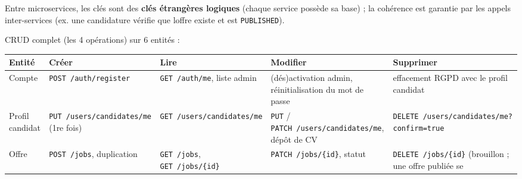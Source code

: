 \documentclass[
  11pt,
]{article}
\begin{document}
Entre microservices, les clés sont des \textbf{clés étrangères logiques}
(chaque service possède sa base) ; la cohérence est garantie par les
appels inter-services (ex. une candidature vérifie que
l\textquotesingle offre existe et est \texttt{PUBLISHED}).

CRUD complet (les 4 opérations) sur 6 entités :

\begin{longtable}[]{@{}
  >{\raggedright\arraybackslash}p{}
  >{\raggedright\arraybackslash}p{}
  >{\raggedright\arraybackslash}p{}
  >{\raggedright\arraybackslash}p{}
  >{\raggedright\arraybackslash}p{}@{}}
\toprule\noalign{}
\begin{minipage}[b]{\linewidth}\raggedright
Entité
\end{minipage} & \begin{minipage}[b]{\linewidth}\raggedright
Créer
\end{minipage} & \begin{minipage}[b]{\linewidth}\raggedright
Lire
\end{minipage} & \begin{minipage}[b]{\linewidth}\raggedright
Modifier
\end{minipage} & \begin{minipage}[b]{\linewidth}\raggedright
Supprimer
\end{minipage} \\
\midrule\noalign{}
\endhead
\bottomrule\noalign{}
\endlastfoot
Compte & \texttt{POST\ /auth/register} & \texttt{GET\ /auth/me}, liste
admin & (dés)activation admin, réinitialisation du mot de passe &
effacement RGPD avec le profil candidat \\
Profil candidat &
\texttt{PUT\ /}\allowbreak{}\texttt{users/}\allowbreak{}\texttt{candidates/}\allowbreak{}\texttt{me}
(1re fois) &
\texttt{GET\ /}\allowbreak{}\texttt{users/}\allowbreak{}\texttt{candidates/}\allowbreak{}\texttt{me}
& \texttt{PUT} /
\texttt{PATCH\ /}\allowbreak{}\texttt{users/}\allowbreak{}\texttt{candidates/}\allowbreak{}\texttt{me},
dépôt de CV &
\texttt{DELETE\ /}\allowbreak{}\texttt{users/}\allowbreak{}\texttt{candidates/}\allowbreak{}\texttt{me?confirm=true} \\
Offre & \texttt{POST\ /jobs}, duplication & \texttt{GET\ /jobs},
\texttt{GET\ /jobs/\{id\}} & \texttt{PATCH\ /jobs/\{id\}}, statut &
\texttt{DELETE\ /jobs/\{id\}} (brouillon ; une offre publiée se

\end{longtable}
\end{document}
